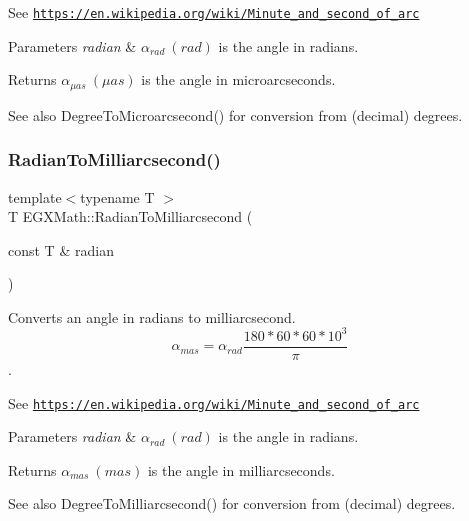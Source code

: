 See \href{https://en.wikipedia.org/wiki/Minute_and_second_of_arc}{\tt https\+://en.\+wikipedia.\+org/wiki/\+Minute\+\_\+and\+\_\+second\+\_\+of\+\_\+arc} 
\begin{DoxyParams}{Parameters}
{\em radian} & $\alpha_{rad}\ (rad)$ is the angle in radians. \\
\hline
\end{DoxyParams}
\begin{DoxyReturn}{Returns}
$\alpha_{\mu as}\ (\mu as)$ is the angle in microarcseconds. 
\end{DoxyReturn}
\begin{DoxySeeAlso}{See also}
Degree\+To\+Microarcsecond() for conversion from (decimal) degrees. 
\end{DoxySeeAlso}
\mbox{\label{group___e_g_x_math-_angle_conversions-_radian_ga84fbb494a455cfeb30be62776f96c9a9}} 
\subsubsection{\texorpdfstring{Radian\+To\+Milliarcsecond()}{RadianToMilliarcsecond()}}
{\footnotesize\ttfamily template$<$typename T $>$ \\
T E\+G\+X\+Math\+::\+Radian\+To\+Milliarcsecond (\begin{DoxyParamCaption}\item[{const T \&}]{radian }\end{DoxyParamCaption})}



Converts an angle in radians to milliarcsecond. \[\alpha_{mas}=\alpha_{rad}\frac{180 * 60 * 60 * 10^3}{\pi}\]. 

See \href{https://en.wikipedia.org/wiki/Minute_and_second_of_arc}{\tt https\+://en.\+wikipedia.\+org/wiki/\+Minute\+\_\+and\+\_\+second\+\_\+of\+\_\+arc} 
\begin{DoxyParams}{Parameters}
{\em radian} & $\alpha_{rad}\ (rad)$ is the angle in radians. \\
\hline
\end{DoxyParams}
\begin{DoxyReturn}{Returns}
$\alpha_{mas}\ (mas)$ is the angle in milliarcseconds. 
\end{DoxyReturn}
\begin{DoxySeeAlso}{See also}
Degree\+To\+Milliarcsecond() for conversion from (decimal) degrees. 
\end{DoxySeeAlso}
\mbox{\label{group___e_g_x_math-_angle_conversions-_radian_gaea391f0cca39b05e298dd1cae162e7f1}} 
